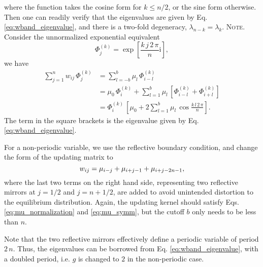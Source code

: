 \documentclass[reprint, superscriptaddress, floatfix]{revtex4-1}
\newcommand{\note}[1]{{\color{DarkGreen}\footnotesize \textsc{Note.} #1}}
\newcommand{\ii}{\mathrm{i}}
\begin{document}
%
where the function takes the cosine form for $k \le n/2$,
or the sine form otherwise.
%
Then one can readily verify that the eigenvalues are given by
  Eq. \eqref{eq:wband_eigenvalue},
  and there is a two-fold degeneracy,
  $\lambda_{n - k} = \lambda_k$.
\note{Consider the unnormalized exponential equivalent
  $$
  \Phi^{(k)}_j =
  \exp\left[
    \frac{ k \, j \, 2 \, \pi }
         {      n             }
    \ii
  \right]
  ,
  $$
  we have
  $$
  \begin{aligned}
  \sum_{j = 1}^n
    w_{ij} \, \Phi^{(k)}_j
  &=
  \sum_{l = -b}^b
    \mu_l \, \Phi^{(k)}_{i - l}
  \\
  &=
  \mu_0 \, \Phi^{(k)}_i
  +
  \sum_{l = 1}^b
    \mu_l \,
    \left[ \Phi^{(k)}_{i - l} + \Phi^{(k)}_{i + l} \right]
  \\
  &=
  \Phi^{(k)}_i \,
  \left[
    \mu_0
    +
    2 \sum_{l = 1}^b
      \mu_l \, \cos
      \frac{ k \, l \, 2 \, \pi }
           {      n             }
  \right]
  .
  \end{aligned}
  $$
  The term in the square brackets is the eigenvalue given by
  Eq. \eqref{eq:wband_eigenvalue}.
}
%


For a non-periodic variable,
we use the reflective boundary condition\cite{bussi2006},
and change the form of the updating matrix to
%
%
\begin{equation}
  w_{ij}
  =
  \mu_{ i - j }
  +
  \mu_{ i + j - 1 }
  +
  \mu_{ i + j - 2 n - 1 }
  ,
  \notag
\end{equation}
%
where the last two terms on the right hand side,
representing two reflective mirrors at
$j = 1/2$ and $j = n + 1/2$,
are added to avoid unintended distortion\cite{dickson2011, mcgovern2013}
to the equilibrium distribution\cite{bussi2006}.
%
Again, the updating kernel should satisfy
Eqs. \eqref{eq:mu_normalization}
and \eqref{eq:mu_symm},
but
the cutoff $b$ only needs to be less than $n$.

Note that the two reflective mirrors effectively
define a periodic variable of period $2 \, n$.
Thus, the eigenvalues can be borrowed from
Eq. \eqref{eq:wband_eigenvalue},
with a doubled period,
i.e. $g$ is changed to $2$ in the non-periodic case.

\end{document}
